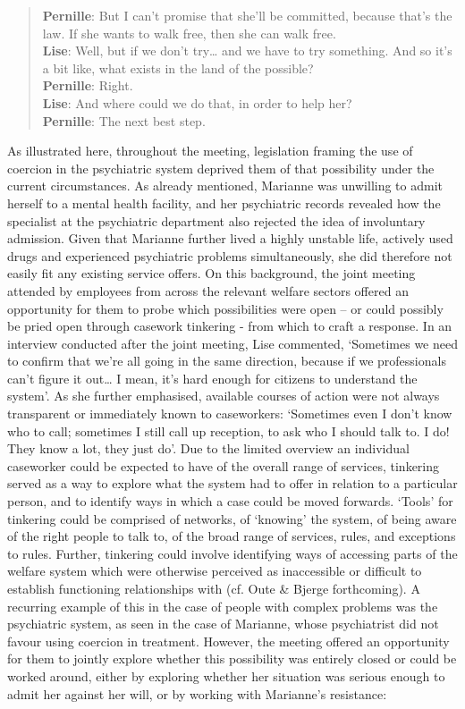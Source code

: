     \blockquote{\textnormal{\bfseries Pernille}:	But I can’t promise that she’ll be committed, because that’s the law. If she wants to walk free, then she can walk free.
    \\\textnormal{\bfseries Lise}: Well, but if we don’t try… and we have to try something. And so it’s a bit like, what exists in the land of the possible?
    \\\textnormal{\bfseries Pernille}: Right.
    \\\textnormal{\bfseries Lise}: And where could we do that, in order to help her?
    \\\textnormal{\bfseries Pernille}: The next best step.}
As illustrated here, throughout the meeting, legislation framing the use of coercion in the psychiatric system deprived them of that possibility under the current circumstances. As already mentioned, Marianne was unwilling to admit herself to a mental health facility, and her psychiatric records revealed how the specialist at the psychiatric department also rejected the idea of involuntary admission. Given that Marianne further lived a highly unstable life, actively used drugs and experienced psychiatric problems simultaneously, she did therefore not easily fit any existing service offers. On this background, the joint meeting attended by employees from across the relevant welfare sectors offered an opportunity for them to probe which possibilities were open – or could possibly be pried open through casework tinkering - from which to craft a response. In an interview conducted after the joint meeting, Lise commented, ‘Sometimes we need to confirm that we’re all going in the same direction, because if we professionals can’t figure it out… I mean, it’s hard enough for citizens to understand the system’. As she further emphasised, available courses of action were not always transparent or immediately known to caseworkers: ‘Sometimes even I don’t know who to call; sometimes I still call up reception, to ask who I should talk to. I do! They know a lot, they just do’. Due to the limited overview an individual caseworker could be expected to have of the overall range of services, tinkering served as a way to explore what the system had to offer in relation to a particular person, and to identify ways in which a case could be moved forwards. ‘Tools’ for tinkering could be comprised of networks, of ‘knowing’ the system, of being aware of the right people to talk to, of the broad range of services, rules, and exceptions to rules. Further, tinkering could involve identifying ways of accessing parts of the welfare system which were otherwise perceived as inaccessible or difficult to establish functioning relationships with (cf. Oute \& Bjerge forthcoming). A recurring example of this in the case of people with complex problems was the psychiatric system, as seen in the case of Marianne, whose psychiatrist did not favour using coercion in treatment. However, the meeting offered an opportunity for them to jointly explore whether this possibility was entirely closed or could be worked around, either by exploring whether her situation was serious enough to admit her against her will, or by working with Marianne’s resistance:
